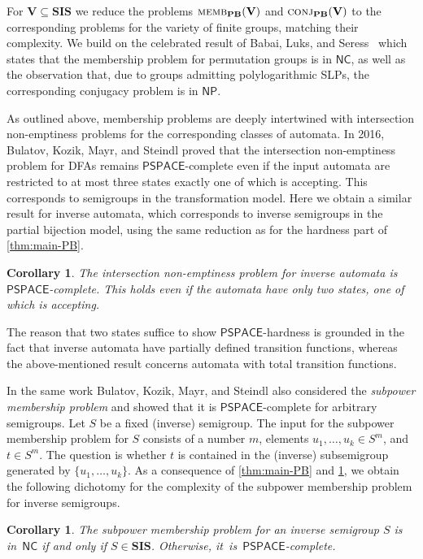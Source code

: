 \documentclass[anonymous,letter,UKenglish,cleveref,autoref,thm-restate]{lipics-v2021}
\newcommand{\sse}{\subseteq}
\newcommand{\NC}{\ensuremath{\mathsf{NC}}\xspace}
\newcommand{\NP}{\ensuremath{\mathsf{NP}}\xspace}
\newcommand{\PSPACE}{\ensuremath{\mathsf{PSPACE}}\xspace}
\newcommand{\vV}{\ensuremath{\mathbf{V}}}
\newcommand{\vSI}{\ensuremath{\mathbf{SIS}}}
\theoremstyle{plain}
\theoremstyle{plain}
\newtheorem{maincorollary}[maintheorem]{Corollary}
\newcommand{\dMemb}[2][]{\textup{\textsc{memb${}_{\mathbf{#1}}\expandafter\ifx\expandafter\relax\detokenize{#2}\relax\else(#2)\fi$}}}
\newcommand{\dConj}[2][]{\textup{\textsc{conj${}_{\mathbf{#1}}\expandafter\ifx\expandafter\relax\detokenize{#2}\relax\else(#2)\fi$}}}
\begin{document}
For $\vV \sse \vSI$ we reduce the problems $\dMemb[PB]{\vV}$ and $\dConj[PB]{\vV}$ to the corresponding problems for the variety of finite groups, matching their complexity.
We build on the celebrated result of Babai, Luks, and Seress~\cite{BabaiLS87} which states that the membership problem for permutation groups is in \NC, as well as the observation that, due to groups admitting polylogarithmic SLPs, the corresponding conjugacy problem is in \NP.



\medbreak

As outlined above, membership problems are deeply intertwined with intersection non-emptiness problems for the corresponding classes of automata.
In 2016, Bulatov, Kozik, Mayr, and Steindl \cite{BulatovKMS16} proved that the intersection non-emptiness problem for DFAs remains \PSPACE-complete even if the input automata are restricted to at most three states exactly one of which is accepting.
This corresponds to semigroups in the transformation model.
Here we obtain a similar result for inverse automata, which corresponds to inverse semigroups in the partial bijection model, using the same reduction as for the hardness part of \cref{thm:main-PB}.

\begin{maincorollary}\label{cor:main-intersection}
	 The intersection non-emptiness problem for inverse automata is \PSPACE-complete.
   This holds even if the automata have only two states, one of which is accepting.
\end{maincorollary}

The reason that two states suffice to show \PSPACE-hardness is grounded in the fact that inverse automata have partially defined transition functions, whereas the above-mentioned result concerns automata with total transition functions.

In the same work Bulatov, Kozik, Mayr, and Steindl also considered the \emph{subpower membership problem} and showed that it is \PSPACE-complete for arbitrary semi\-groups.
Let $S$ be a fixed (inverse) semigroup.
The input for the subpower membership problem for $S$ consists of a number $m$, elements $u_1, \dots, u_k \in S^m$, and $t\in S^m$.
The question is whether $t $ is contained in the (inverse) subsemigroup generated by $\{u_1, \dots, u_k\}$.
As a consequence of \cref{thm:main-PB} and \cref{cor:main-intersection}, we obtain the following dichotomy for the complexity of the subpower membership problem for inverse semigroups.

\begin{maincorollary}\label{cor:main-subpower}
The subpower membership problem for an inverse semigroup $S$ is in~\NC if and only if $S \in \vSI$.
		Otherwise, it~is~\PSPACE-complete.	
\end{maincorollary}
\end{document}
